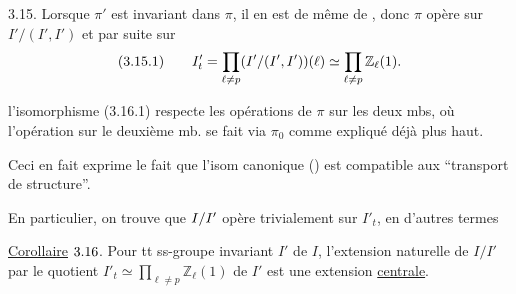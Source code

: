 3.15. Lorsque $\pi'$ est invariant dans $\pi$,  il en est de même de  , donc   $\pi$ opère sur $I'/(I',I')$ \unsure{,} et par suite sur
\[
(3.{15}.1)\qquad I'_t=\prod_{\ell\ne p}(I'/(I',I'))(\ell)\simeq\prod_{\ell\ne p}\mathbb Z_\ell(1).
\]

 l'isomorphisme  (3.16.1) respecte les opérations de $\pi$ sur les deux mbs, où l'opération sur le deuxième mb.  se fait via $\pi_0$ comme expliqué déjà plus haut.

Ceci en fait exprime le fait que l'isom canonique () est compatible aux ``transport de structure''.

En particulier, on trouve que $I{/I'}$ opère trivialement sur $I'_t$, en d'autres termes

\uline{Corollaire} $3.{16}$. Pour tt ss-groupe  invariant $I'$  de $I$, l'extension naturelle de $I/I'$ par le quotient $I'_t\simeq\prod_{\ell\ne p}\mathbb Z_\ell(1)$ de $I'$ est une extension \uline{centrale}.
